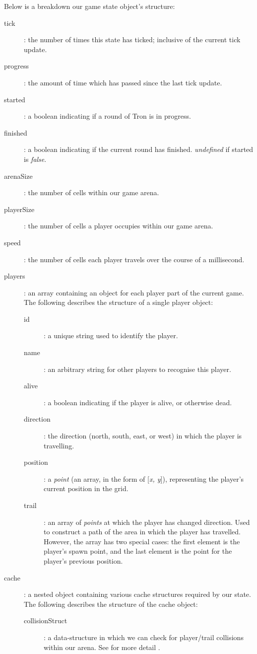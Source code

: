 \documentclass{standalone}
\begin{document}
		Below is a breakdown our game state object's structure:
		\begin{description}
        \item[tick]: the number of times this state has ticked; inclusive of the current tick update.
        \item[progress]: the amount of time which has passed since the last tick update.
        \item[started]: a boolean indicating if a round of Tron is in progress.
        \item[finished]: a boolean indicating if the current round has finished. \emph{undefined} if started is \emph{false}.
        \item[arenaSize]: the number of cells within our game arena.
        \item[playerSize]: the number of cells a player occupies within our game arena.
        \item[speed]: the number of cells each player travels over the course of a millisecond.
        \item[players]: an array containing an object for each player part of the current game. The following describes the structure of a single player object:
        \begin{description}
        	\item[id]: a unique string used to identify the player.
        	\item[name]: an arbitrary string for other players to recognise this player.
        	\item[alive]: a boolean indicating if the player is alive, or otherwise dead.
        	\item[direction]: the direction (north, south, east, or west) in which the player is travelling.
        	\item[position]: a \emph{point} (an array, in the form of [\emph{x, y}]), representing the player's current position in the grid.
        	\item[trail]: an array of \emph{points} at which the player has changed direction. Used to construct a path of the area in which the player has travelled. However, the array has two special cases: the first element is the player's spawn point, and the last element is the point for the player's previous position.
      	\end{description}
        \item[cache]: a nested object containing various cache structures required by our state. The following describes the structure of the cache object:
        \begin{description}
        	\item[collisionStruct]: a data-structure in which we can check for player/trail collisions within our arena. See for more detail .
      	\end{description}
    \end{description}
\end{document}
